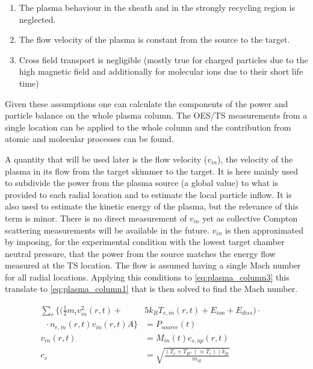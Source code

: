 \begin{enumerate}
    \item The plasma behaviour in the sheath and in the strongly recycling region is neglected.
    \item The flow velocity of the plasma is constant from the source to the target.
    \item Cross field transport is negligible (mostly true for charged particles due to the high magnetic field and additionally for molecular ions due to their short life time)
\end{enumerate}

Given these assumptions one can calculate the components of the power and particle balance on the whole plasma column. The OES/TS measurements from a single location can be applied to the whole column and the contribution from atomic and molecular processes can be found.

A quantity that will be used later is the flow velocity ($v_{in}$), the velocity of the plasma in its flow from the target skimmer to the target. It is here mainly used to subdivide the power from the plasma source (a global value) to what is provided to each radial location and to estimate the local particle inflow. It is also used to estimate the kinetic energy of the plasma, but the relevance of this term is minor. There is no direct measurement of $v_{in}$ yet as collective Compton scattering measurements will be available in the future. $v_{in}$ is then approximated by imposing, for the experimental condition with the lowest target chamber neutral pressure, that the power from the source matches the energy flow measured at the TS location. The flow is assumed having a single Mach number for all radial locations. Applying this conditions to \autoref{eq:plasma_column3} this translate to \autoref{eq:plasma_column1} that is then solved to find the Mach number.


\begin{equation}
\label{eq:plasma_column1}
\begin{aligned}
\sum_{r} \biggl\{ \biggl(\frac{1}{2} m_i v_{in}^2(r,t) +
&%
5k_B T_{e,in}(r,t) + E_{ion} + E_{diss} \biggr) \cdot \phantom{\biggr\}} & \\ \phantom{\biggl\{} \cdot n_{e,in}(r,t) v_{in}(r,t)A \biggr\} &= P_{source}(t)
\\
v_{in}(r,t) &= M_{in}(t) c_{s,up}(r,t) \\  c_s &= \sqrt{\frac{ \left(T_e + T_{H^+{}}( {}\approx T_e) \right)k_B}{m_H} }
\end{aligned}
\end{equation}

